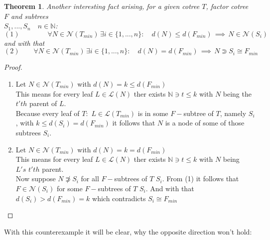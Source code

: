 \documentclass[a4paper,12pt]{article}
\newtheorem{theorem}{Theorem}[section]
\theoremstyle{definition}
\begin{document}
	\begin{theorem}
	Another interesting fact arising, for a given cotree $T$, factor cotree $F$ and subtrees\\ $S_1,...,S_n\quad n\in\mathds{N}$:
	\[(1)\qquad\qquad\forall N\in \mathcal{N}(T_{min})\, \exists i\in\{1,...,n\}:\quad d(N)\leq d(F_{min})\,\implies\, N\in \mathcal{N}(S_i) \]
	and with that 
	\[(2)\qquad \forall N\in \mathcal{N}(T_{min})\, \exists i\in\{1,...,n\}:\quad d(N)= d(F_{min})\,\implies\, N\Supset S_i\cong F_{min} \]
	\end{theorem}
	\begin{proof}
		\begin{enumerate}[(1)]
			\item Let $N\in \mathcal{N}(T_{min})$ with $d(N)= k\leq d(F_{min})$\\
			This means for every leaf $L\in \mathcal{L}(N)$ ther exists $\mathds{N}\ni t\leq k$ with $N$ being the $ t'th$ parent of $L$.\\
			Because every leaf of $T$: $\, L\in \mathcal{L}(T_{min})$ is in some $F-$subtree of $T$, namely $S_i$, with $k \leq d(S_i)=d(F_{min})$ it follows that $N$ is a node of some of those subtrees $S_i$.
			\item  Let $N\in \mathcal{N}(T_{min})$ with $d(N)= k=d(F_{min})$\\
			This means for every leaf $L\in \mathcal{L}(N)$ ther exists $\mathds{N}\ni t\leq k$ with $N$ being $L's\,\, t'th$ parent.\\
			Now suppose $N\not \Supset S_i$ for all $F-$subtrees of $T$ $S_i$.
			From (1) it follows that $F\in \mathcal{N}(S_i)$ for some $F-$subtrees of $T$ $S_i$. And with that $d(S_i)>d(F_{min})=k$ which contradicts $S_i\cong F_{min}$
		\end{enumerate}
	\end{proof}
	With this counterexample it will be clear, why the opposite direction won't hold:
	\begin{center}
	\end{center}
\end{document}
